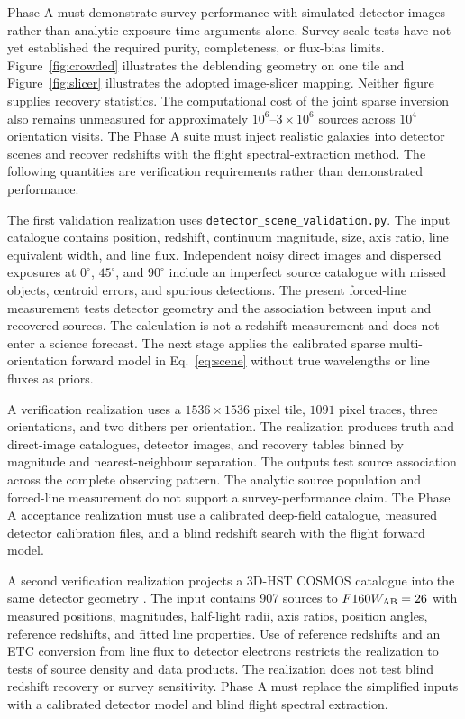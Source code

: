 Phase A must demonstrate survey performance with simulated detector images rather than analytic exposure-time arguments alone. Survey-scale tests have not yet established the required purity, completeness, or flux-bias limits. Figure~\ref{fig:crowded} illustrates the deblending geometry on one tile and Figure~\ref{fig:slicer} illustrates the adopted image-slicer mapping. Neither figure supplies recovery statistics. The computational cost of the joint sparse inversion also remains unmeasured for approximately $10^6$--$3\times10^6$ sources across $10^4$ orientation visits. The Phase A suite must inject realistic galaxies into detector scenes and recover redshifts with the flight spectral-extraction method. The following quantities are verification requirements rather than demonstrated performance.

The first validation realization uses \texttt{detector\_scene\_validation.py}. The input catalogue contains position, redshift, continuum magnitude, size, axis ratio, line equivalent width, and line flux. Independent noisy direct images and dispersed exposures at $0^\circ$, $45^\circ$, and $90^\circ$ include an imperfect source catalogue with missed objects, centroid errors, and spurious detections. The present forced-line measurement tests detector geometry and the association between input and recovered sources. The calculation is not a redshift measurement and does not enter a science forecast. The next stage applies the calibrated sparse multi-orientation forward model in Eq.~\ref{eq:scene} without true wavelengths or line fluxes as priors.

A verification realization uses a $1536\times1536$ pixel tile, $1091$ pixel traces, three orientations, and two dithers per orientation. The realization produces truth and direct-image catalogues, detector images, and recovery tables binned by magnitude and nearest-neighbour separation. The outputs test source association across the complete observing pattern. The analytic source population and forced-line measurement do not support a survey-performance claim. The Phase A acceptance realization must use a calibrated deep-field catalogue, measured detector calibration files, and a blind redshift search with the flight forward model.

A second verification realization projects a 3D-HST COSMOS catalogue into the same detector geometry \cite{skelton2014,momcheva2016}. The input contains 907 sources to $F160W_{\rm AB}=26$ with measured positions, magnitudes, half-light radii, axis ratios, position angles, reference redshifts, and fitted line properties. Use of reference redshifts and an ETC conversion from line flux to detector electrons restricts the realization to tests of source density and data products. The realization does not test blind redshift recovery or survey sensitivity. Phase A must replace the simplified inputs with a calibrated detector model and blind flight spectral extraction.

